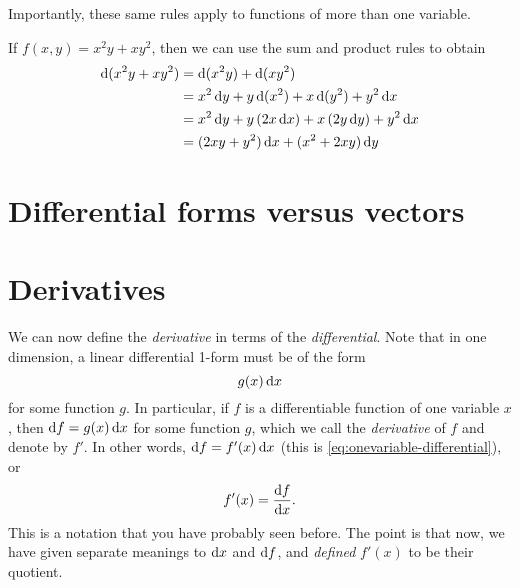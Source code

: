 \documentclass[12pt]{amsart}
\begin{document}
Importantly, these same rules apply to functions of more than one variable.

\begin{eg}\label{eg:twovar-differential}
  If $f(x,y) = x^2y + xy^2$, then we can use the sum and product rules to obtain
  \begin{align*}
    \mathrm{d}(x^2y + xy^2) &= \mathrm{d}(x^2y) + \mathrm{d}(xy^2)\\
    &= x^2\,\mathrm{d} y + y \,\mathrm{d}(x^2) + x \,\mathrm{d}(y^2) + y^2\,\mathrm{d} x\\
    &= x^2\,\mathrm{d} y + y \,(2x\,\mathrm{d} x) + x\, (2y\,\mathrm{d} y) + y^2\,\mathrm{d} x\\
    &= (2xy + y^2)\,\mathrm{d} x + (x^2+2xy)\,\mathrm{d} y
  \end{align*}
\end{eg}

\section{Differential forms versus vectors}
\label{sec:forms-vs-vectors}


\section{Derivatives}
\label{sec:derivatives}

We can now define the \emph{derivative} in terms of the \emph{differential}.
Note that in one dimension, a linear differential 1-form must be of the form
\[ g(x) \,\mathrm{d} x \]
for some function $g$.
In particular, if $f$ is a differentiable function of one variable $x$, then $\mathrm{d} f = g(x) \, \mathrm{d} x$ for some function $g$, which we call the \emph{derivative} of $f$ and denote by $f'$.
In other words, $\mathrm{d} f = f'(x)\,\mathrm{d} x$ (this is \cref{eq:onevariable-differential}), or
\[ f'(x) = \frac{\mathrm{d} f}{\mathrm{d} x}. \]
This is a notation that you have probably seen before.
The point is that now, we have given separate meanings to $\mathrm{d} x$ and $\mathrm{d} f$, and \emph{defined} $f'(x)$ to be their quotient.
\end{document}
